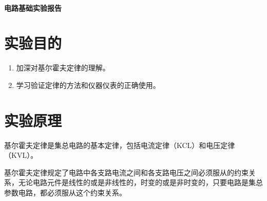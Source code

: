 \documentclass[a4paper,utf8]{article}
\begin{document}
\begin{center}
    {\mbox{}\\[7em]\bfseries\songti%
    电路基础实验报告}\\[34mm]
\end{center}
\newpage
\section{实验目的}
\begin{enumerate}
    \item 加深对基尔霍夫定律的理解。
    \item 学习验证定律的方法和仪器仪表的正确使用。
\end{enumerate}

\section{实验原理}%
基尔霍夫定律是集总电路的基本定律，包括电流定律（KCL）和电压定律（KVL）。\par
基尔霍夫定律规定了电路中各支路电流之间和各支路电压之间必须服从的约束关系，无论电路元件是线性的或是非线性的，时变的或是非时变的，只要电路是集总参数电路，都必须服从这个约束关系。
\end{document}
